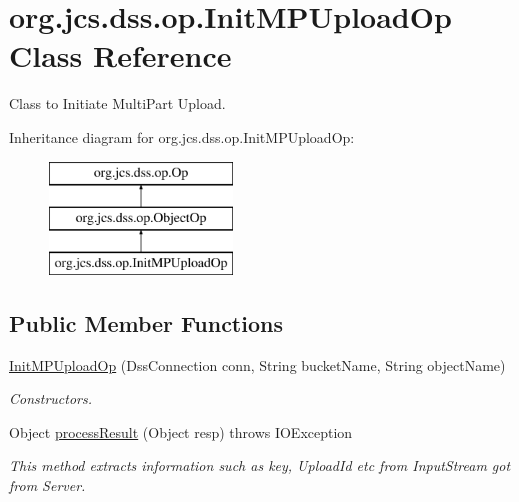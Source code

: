 \hypertarget{classorg_1_1jcs_1_1dss_1_1op_1_1InitMPUploadOp}{}\section{org.\+jcs.\+dss.\+op.\+Init\+M\+P\+Upload\+Op Class Reference}
\label{classorg_1_1jcs_1_1dss_1_1op_1_1InitMPUploadOp}


Class to Initiate Multi\+Part Upload.  


Inheritance diagram for org.\+jcs.\+dss.\+op.\+Init\+M\+P\+Upload\+Op\+:\begin{figure}[H]
\begin{center}
\leavevmode
\includegraphics[height=3.000000cm]{classorg_1_1jcs_1_1dss_1_1op_1_1InitMPUploadOp}
\end{center}
\end{figure}
\subsection*{Public Member Functions}
\begin{DoxyCompactItemize}
\item 
\hyperlink{classorg_1_1jcs_1_1dss_1_1op_1_1InitMPUploadOp_a33e5403cd929ba5cf46987e1dc6858c0}{Init\+M\+P\+Upload\+Op} (Dss\+Connection conn, String bucket\+Name, String object\+Name)\hypertarget{classorg_1_1jcs_1_1dss_1_1op_1_1InitMPUploadOp_a33e5403cd929ba5cf46987e1dc6858c0}{}\label{classorg_1_1jcs_1_1dss_1_1op_1_1InitMPUploadOp_a33e5403cd929ba5cf46987e1dc6858c0}

\begin{DoxyCompactList}\small\item\em Constructors. \end{DoxyCompactList}\item 
Object \hyperlink{classorg_1_1jcs_1_1dss_1_1op_1_1InitMPUploadOp_a6ecc510bdcc5f8301f42865f7a83d4f9}{process\+Result} (Object resp)  throws I\+O\+Exception
\begin{DoxyCompactList}\small\item\em This method extracts information such as key, Upload\+Id etc from Input\+Stream got from Server. \end{DoxyCompactList}\end{DoxyCompactItemize}
